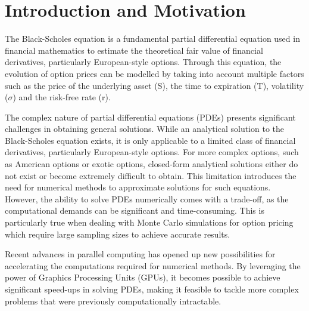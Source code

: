 
\section{Introduction and Motivation}
The Black-Scholes equation is a fundamental partial differential equation used in financial mathematics to estimate the theoretical fair value of financial derivatives, particularly European-style options. Through this equation, the evolution of option prices can be modelled by taking into account multiple factors such as the price of the underlying asset (S), the time to expiration (T), volatility ($\sigma$) and the risk-free rate (r).

The complex nature of partial differential equations (PDEs) presents significant challenges in obtaining general solutions. While an analytical solution to the Black-Scholes equation exists, it is only applicable to a limited class of financial derivatives, particularly European-style options. For more complex options, such as American options or exotic options, closed-form analytical solutions either do not exist or become extremely difficult to obtain. This limitation introduces the need for numerical methods to approximate solutions for such equations. However, the ability to solve PDEs numerically comes with a trade-off, as the computational demands can be significant and time-consuming. This is particularly true when dealing with Monte Carlo simulations for option pricing which require large sampling sizes to achieve accurate results.

Recent advances in parallel computing has opened up new possibilities for accelerating the computations required for numerical methods. By leveraging the power of Graphics Processing Units (GPUs), it becomes possible to achieve significant speed-ups in solving PDEs, making it feasible to tackle more complex problems that were previously computationally intractable.

